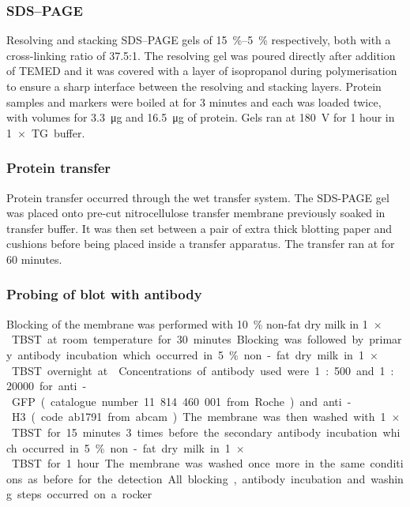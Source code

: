     \subsubsection{SDS--PAGE}
      Resolving and stacking SDS--PAGE gels of \SIrange{15}{5}{\percent} respectively, both with a
      cross-linking ratio of \num{37.5}:1. The resolving gel was poured directly after addition
      of TEMED and it was covered with a layer of isopropanol during polymerisation
      to ensure a sharp interface between the resolving and stacking layers.
      Protein samples and markers were boiled at  for 3 minutes and each
      was loaded twice, with volumes for \SI{3.3}{\ug} and \SI{16.5}{\ug} of protein. Gels ran at
      \SI{180}{\volt} for 1 hour in \SI{1}{$\times$} TG buffer.
    
    \subsubsection{Protein transfer}
      Protein transfer occurred through the wet transfer system. The SDS-PAGE gel
      was placed onto pre-cut nitrocellulose transfer membrane previously soaked in
      transfer buffer. It was then set between a pair of extra thick blotting paper and
      cushions before being placed inside a transfer apparatus. The transfer ran at
       for 60 minutes.
    
    \subsubsection{Probing of blot with antibody}
      Blocking of the membrane was performed with \SI{10}{\percent} non-fat dry milk in \SI{1}{$\times$} TBST
      at room temperature for 30 minutes. Blocking was followed by primary antibody
      incubation which occurred in \SI{5}{\percent} non-fat dry milk in \SI{1}{$\times$} TBST overnight at
      . Concentrations of antibody used were 1:500 and 1:20000 for anti-GFP
      (catalogue number 11 814 460 001 from Roche) and anti-H3 (code ab1791 from
      abcam). The membrane was then washed with \SI{1}{$\times$} TBST for 15 minutes 3 times
      before the secondary antibody incubation which occurred in \SI{5}{\percent} non-fat dry
      milk in \SI{1}{$\times$} TBST for 1 hour. The membrane was washed once more in the same
      conditions as before for the detection. All blocking, antibody incubation and
      washing steps occurred on a rocker.
      

